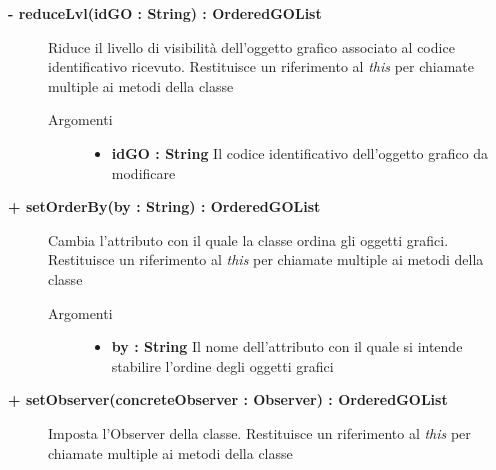\begin{description}
	\begin{description}
		\item[\textbf{\color{blue}- reduceLvl(idGO : String) : OrderedGOList			}] \hfill
			Riduce il livello di visibilità dell'oggetto grafico associato al codice identificativo ricevuto. Restituisce un riferimento al \textit{this} per chiamate multiple ai metodi della classe
			
		\begin{description}
			\item[Argomenti] \hfill
				\begin{itemize}
				
					\item \textbf{idGO : String			} \hfill
					Il codice identificativo dell'oggetto grafico da modificare
					
				\end{itemize}
		\end{description}
	\end{description}
	
	\begin{description}
		\item[\textbf{\color{blue}+ setOrderBy(by : String) : OrderedGOList			}] \hfill
			Cambia l'attributo con il quale la classe ordina gli oggetti grafici. Restituisce un riferimento al \textit{this} per chiamate multiple ai metodi della classe
			
		\begin{description}
			\item[Argomenti] \hfill
				\begin{itemize}
				
					\item \textbf{by : String			} \hfill
					Il nome dell'attributo con il quale si intende stabilire l'ordine degli oggetti grafici
					
				\end{itemize}
		\end{description}
	\end{description}
	
	\begin{description}
		\item[\textbf{\color{blue}+ setObserver(concreteObserver : Observer) : OrderedGOList			}] \hfill
			Imposta l'Observer della classe. Restituisce un riferimento al \textit{this} per chiamate multiple ai metodi della classe
			

\end{description}
\end{description}
